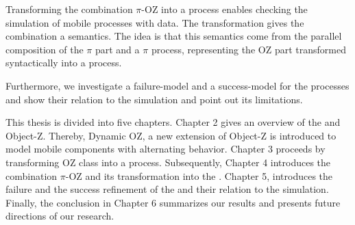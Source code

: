  Transforming the combination $\pi$-OZ into a \picalc{} process enables checking the simulation of mobile processes with data. The transformation gives the combination a \picalc{} semantics. The idea is that this semantics come from the parallel composition of the $\pi$ part and a $\pi$ process, representing the OZ part transformed syntactically into a \picalc{} process.

 Furthermore, we investigate a failure-model and a success-model for the \picalc{} processes and show their relation to the simulation and point out its limitations.

This thesis is divided into five chapters. Chapter 2 gives an overview of the \picalc{} and Object-Z. Thereby, Dynamic OZ, a new extension of Object-Z is introduced to model mobile components with alternating behavior. Chapter 3 proceeds by transforming OZ class into a \picalc{} process. Subsequently, Chapter 4 introduces the combination $\pi$-OZ and its transformation into the \picalc{}. Chapter 5, introduces the failure and the success refinement of the \picalc{} and their relation to the simulation. Finally, the conclusion in Chapter 6 summarizes our results and presents future directions of our research.

